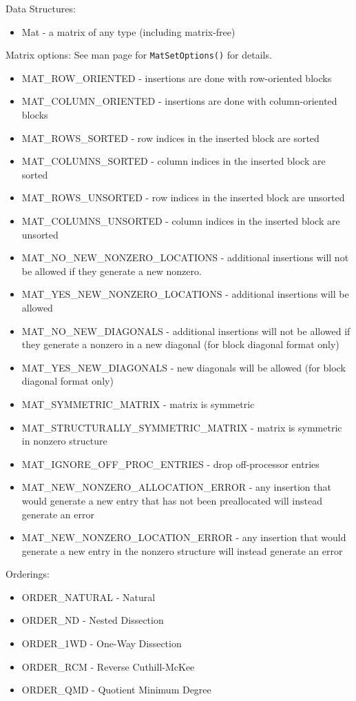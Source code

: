 \noindent
Data Structures: 
\begin{itemize}
\item Mat - a matrix of any type (including matrix-free)
\end{itemize}
Matrix options:  See man page for {\tt MatSetOptions()} for details. 
\begin{itemize}
\item MAT\_ROW\_ORIENTED - insertions are done with row-oriented blocks
\item MAT\_COLUMN\_ORIENTED - insertions are done with column-oriented blocks
\item MAT\_ROWS\_SORTED - row indices in the inserted block are sorted
\item MAT\_COLUMNS\_SORTED - column indices in the inserted block are sorted
\item MAT\_ROWS\_UNSORTED - row indices in the inserted block are unsorted
\item MAT\_COLUMNS\_UNSORTED - column indices in the inserted block are unsorted
\item MAT\_NO\_NEW\_NONZERO\_LOCATIONS - additional insertions will not be allowed if they
      generate a new nonzero.
\item MAT\_YES\_NEW\_NONZERO\_LOCATIONS - additional insertions will be allowed
\item MAT\_NO\_NEW\_DIAGONALS - additional insertions will not be allowed if
         they generate a nonzero in a new diagonal (for block diagonal format only)
\item MAT\_YES\_NEW\_DIAGONALS - new diagonals will be allowed (for block diagonal format only)
\item MAT\_SYMMETRIC\_MATRIX - matrix is symmetric
\item MAT\_STRUCTURALLY\_SYMMETRIC\_MATRIX - matrix is symmetric in nonzero structure
\item MAT\_IGNORE\_OFF\_PROC\_ENTRIES - drop off-processor entries
\item MAT\_NEW\_NONZERO\_ALLOCATION\_ERROR - any insertion 
   that would generate a new entry that has not been preallocated will instead
   generate an error
\item MAT\_NEW\_NONZERO\_LOCATION\_ERROR - any insertion 
   that would generate a new entry in the nonzero structure will instead generate
   an error
\end{itemize}
Orderings:
\begin{itemize}
\item ORDER\_NATURAL - Natural
\item ORDER\_ND - Nested Dissection
\item ORDER\_1WD - One-Way Dissection 
\item ORDER\_RCM - Reverse Cuthill-McKee
\item ORDER\_QMD - Quotient Minimum Degree
\end{itemize}
